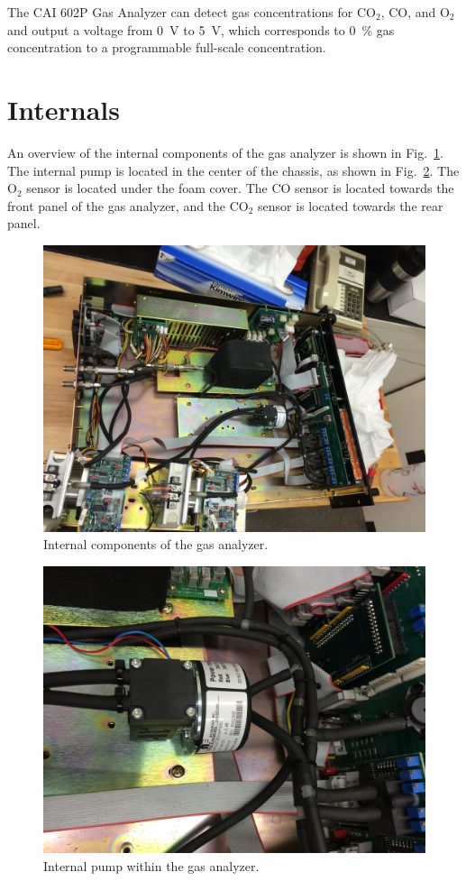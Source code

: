 \documentclass[11pt,oneside]{book}
\begin{document}
The CAI 602P Gas Analyzer can detect gas concentrations for CO$_2$, CO, and O$_2$ and output a voltage from 0~V to 5~V, which corresponds to 0~\% gas concentration to a programmable full-scale concentration.

\section{Internals}

An overview of the internal components of the gas analyzer is shown in Fig.~\ref{fig:gas_analyzer_5}. The internal pump is located in the center of the chassis, as shown in Fig.~\ref{fig:gas_analyzer_3}. The O$_2$ sensor is located under the foam cover. The CO sensor is located towards the front panel of the gas analyzer, and the CO$_2$ sensor is located towards the rear panel.

\begin{figure}[h!]
\includegraphics[width=5in]{../Equipment/Gas_Analyzer/Figures/gas_analyzer_5}
\caption{Internal components of the gas analyzer.}
\label{fig:gas_analyzer_5}
\end{figure}

\begin{figure}[h!]
\includegraphics[width=5in]{../Equipment/Gas_Analyzer/Figures/gas_analyzer_3}
\caption{Internal pump within the gas analyzer.}
\label{fig:gas_analyzer_3}
\end{figure}
\end{document}
